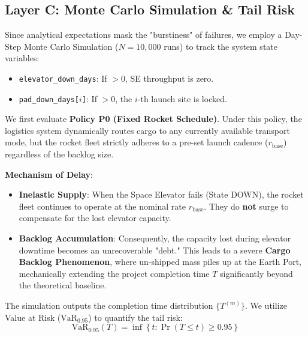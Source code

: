 \documentclass[11pt,letterpaper]{article}
\begin{document}
\subsection{Layer C: Monte Carlo Simulation \& Tail Risk}
Since analytical expectations mask the "burstiness" of failures, we employ a Day-Step Monte Carlo Simulation ($N=10,000$ runs) to track the system state variables:
\begin{itemize}
    \item \texttt{elevator\_down\_days}: If $>0$, SE throughput is zero.
    \item \texttt{pad\_down\_days[$i$]}: If $>0$, the $i$-th launch site is locked.
\end{itemize}

We first evaluate \textbf{Policy P0 (Fixed Rocket Schedule)}. Under this policy, the logistics system dynamically routes cargo to any currently available transport mode, but the rocket fleet strictly adheres to a pre-set launch cadence ($r_{\text{base}}$) regardless of the backlog size.

\noindent \textbf{Mechanism of Delay}:
\begin{itemize}
    \item \textbf{Inelastic Supply}: When the Space Elevator fails (State DOWN), the rocket fleet continues to operate at the nominal rate $r_{\text{base}}$. They do \textbf{not} surge to compensate for the lost elevator capacity.
    \item \textbf{Backlog Accumulation}: Consequently, the capacity lost during elevator downtime becomes an unrecoverable "debt." This leads to a severe \textbf{Cargo Backlog Phenomenon}, where un-shipped mass piles up at the Earth Port, mechanically extending the project completion time $T$ significantly beyond the theoretical baseline.
\end{itemize}

The simulation outputs the completion time distribution $\{T^{(m)}\}$. We utilize Value at Risk ($\text{VaR}_{0.95}$) to quantify the tail risk:
\[
\text{VaR}_{0.95}(T) = \inf \left\{ t : \Pr(T \le t) \ge 0.95 \right\}
\]
\end{document}
